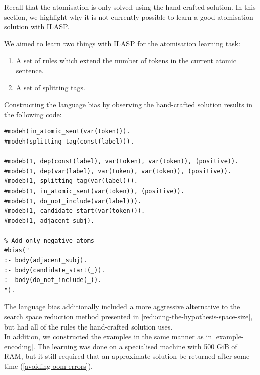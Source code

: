 Recall that the atomisation is only solved using the hand-crafted solution. 
In this section, we highlight why it is not currently possible to learn a good atomisation solution with ILASP.

We aimed to learn two things with ILASP for the atomisation learning task:
\begin{enumerate}
    \item A set of rules which extend the number of tokens in the current atomic sentence.
    \item A set of splitting tags.
\end{enumerate}

Constructing the language bias by observing the hand-crafted solution results in the following code:
\begin{verbatim}
#modeh(in_atomic_sent(var(token))).
#modeh(splitting_tag(const(label))).

#modeb(1, dep(const(label), var(token), var(token)), (positive)).
#modeb(1, dep(var(label), var(token), var(token)), (positive)).
#modeb(1, splitting_tag(var(label))).
#modeb(1, in_atomic_sent(var(token)), (positive)).
#modeb(1, do_not_include(var(label))).
#modeb(1, candidate_start(var(token))). 
#modeb(1, adjacent_subj).

% Add only negative atoms
#bias("
:- body(adjacent_subj).
:- body(candidate_start(_)).
:- body(do_not_include(_)).
").
\end{verbatim}

The language bias additionally included a more aggressive alternative to the search space reduction method presented in \ref{reducing-the-hypothesis-space-size}, but had all of the rules the hand-crafted solution uses. \\
In addition, we constructed the examples in the same manner as in \ref{example-encoding}.
The learning was done on a specialised machine with 500 GiB of RAM, but it still required that an approximate solution be returned after some time (\ref{avoiding-oom-errors}).


